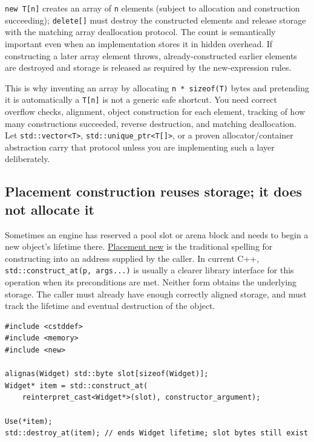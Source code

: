 \texttt{new\ T{[}n{]}} creates an array of \texttt{n} elements (subject to allocation and construction succeeding); \texttt{delete{[}{]}} must destroy the constructed elements and release storage with the matching array deallocation protocol. The count is semantically important even when an implementation stores it in hidden overhead. If constructing a later array element throws, already-constructed earlier elements are destroyed and storage is released as required by the new-expression rules.

This is why inventing an array by allocating \texttt{n\ *\ sizeof(T)} bytes and pretending it is automatically a \texttt{T{[}n{]}} is not a generic safe shortcut. You need correct overflow checks, alignment, object construction for each element, tracking of how many constructions succeeded, reverse destruction, and matching deallocation. Let \texttt{std::vector\textless{}T\textgreater{}}, \texttt{std::unique\_ptr\textless{}T{[}{]}\textgreater{}}, or a proven allocator/container abstraction carry that protocol unless you are implementing such a layer deliberately.

\subsection{Placement construction reuses storage; it does not allocate it}\label{05-engine-i-ch004-placement-construction-reuses-storage-it-does-not-allocate-it}

Sometimes an engine has reserved a pool slot or arena block and needs to begin a new object's lifetime there. \hyperref[appendix-f56c3e43fd4e]{Placement new} is the traditional spelling for constructing into an address supplied by the caller. In current C++, \texttt{std::construct\_at(p,\ args...)} is usually a clearer library interface for this operation when its preconditions are met. Neither form obtains the underlying storage. The caller must already have enough correctly aligned storage, and must track the lifetime and eventual destruction of the object.

\begin{verbatim}
#include <cstddef>
#include <memory>
#include <new>

alignas(Widget) std::byte slot[sizeof(Widget)];
Widget* item = std::construct_at(
    reinterpret_cast<Widget*>(slot), constructor_argument);

Use(*item);
std::destroy_at(item); // ends Widget lifetime; slot bytes still exist
\end{verbatim}

